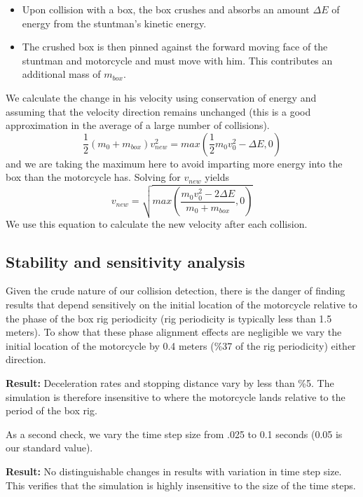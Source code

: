 \documentclass[12pt,a4paper,titlepage]{article}
\begin{document}
\begin{itemize}
\item Upon collision with a box, the box crushes
and absorbs an amount $\Delta E$ of energy from the stuntman's kinetic energy.
\item The crushed box is then pinned against the forward moving face of the stuntman and motorcycle and must move with him.
This contributes an additional mass of $m_{box}$.
\end{itemize}

We calculate the change in his velocity using conservation of energy and assuming that the
velocity direction remains unchanged (this is a good approximation in the average of a large number of collisions).
$$
\frac{1}{2}(m_0+m_{box})v_{new}^2 = max\left(\frac{1}{2}m_0 v_0^2 - \Delta E,0\right)
$$
and we are taking the maximum here to avoid imparting more energy into the box than the motorcycle has.
Solving for $v_{new}$ yields
\begin{equation}\label{newvelocity}
v_{new}=\sqrt{max\left(\frac{m_0 v_0^2 - 2\Delta E}{m_0 + m_{box}},0\right)}
\end{equation}
We use this equation to calculate the new velocity after each collision.

\subsection{Stability and sensitivity analysis}

Given the crude nature of our collision detection, there is the danger of finding results that depend sensitively
on the initial location of the motorcycle relative to the phase of the box rig periodicity (rig periodicity
is typically less than 1.5 meters).  To show that these phase alignment effects are negligible we vary the
initial location of the motorcycle by 0.4 meters (\%37 of the rig periodicity) either direction.

\medskip

{\bf Result:}  Deceleration rates and stopping distance vary by less than \%5.  The simulation is therefore
insensitive to where the motorcycle lands relative to the period of the box rig.

\medskip

As a second check, we vary the time step size from .025 to 0.1 seconds (0.05 is our standard value).

\medskip

{\bf Result:}  No distinguishable changes in results with variation in time step size.  This verifies
 that the simulation is highly insensitive to the size of the time steps.
\end{document}
